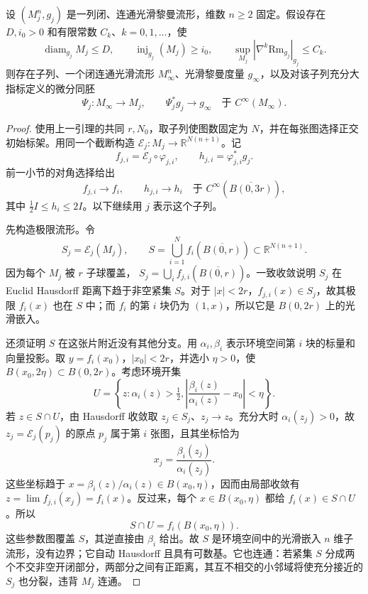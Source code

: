 \begin{theorem}\label{g3:thm:smooth-cheeger-gromov-compactness}
	设 \((M_j^n,g_j)\) 是一列闭、连通光滑黎曼流形，维数 \(n\ge2\) 固定。假设存在 \(D,i_0>0\) 和有限常数 \(C_k\)、\(k=0,1,\ldots\)，使
	\begin{equation}\label{g3:eq:smooth-compactness-assumptions}
		\operatorname{diam}_{g_j}M_j\le D,\qquad
		\operatorname{inj}_{g_j}(M_j)\ge i_0,\qquad
		\sup_{M_j}|\nabla^k\mathrm{Rm}_{g_j}|_{g_j}\le C_k.
	\end{equation}
	则存在子列、一个闭连通光滑流形 \(M_\infty^n\)、光滑黎曼度量 \(g_\infty\)，以及对该子列充分大指标定义的微分同胚
	\[
		\Psi_j:M_\infty\longrightarrow M_j,
		\qquad \Psi_j^*g_j\longrightarrow g_\infty\quad\text{于 }C^\infty(M_\infty).
	\]
\end{theorem}
\begin{proof}
	使用上一引理的共同 \(r,N_0\)，取子列使图数固定为 \(N\)，并在每张图选择正交初始标架。用同一个截断构造
	\(\mathcal E_j:M_j\to\mathbb R^{N(n+1)}\)。记
	\[
		f_{j,i}=\mathcal E_j\circ\varphi_{j,i},\qquad
		h_{j,i}=\varphi_{j,i}^*g_j.
	\]
	前一小节的对角选择给出
	\begin{equation}\label{g3:eq:compactness-local-chart-limits}
		f_{j,i}\longrightarrow f_i,\qquad
		h_{j,i}\longrightarrow h_i
		\quad\text{于 }C^\infty(\overline{B(0,3r)}),
	\end{equation}
	其中 \(\tfrac12 I\le h_i\le2I\)。以下继续用 \(j\) 表示这个子列。

	先构造极限流形。令
	\[
		S_j=\mathcal E_j(M_j),\qquad
		S=\bigcup_{i=1}^N f_i(\overline{B(0,r)})
		\subset\mathbb R^{N(n+1)}.
	\]
	因为每个 \(M_j\) 被 \(r\) 子球覆盖，
	\(S_j=\bigcup_i f_{j,i}(\overline{B(0,r)})\)。一致收敛说明 \(S_j\) 在 Euclid Hausdorff 距离下趋于非空紧集 \(S\)。对于 \(|x|<2r\)，\(f_{j,i}(x)\in S_j\)，故其极限 \(f_i(x)\) 也在 \(S\) 中；而 \(f_i\) 的第 \(i\) 块仍为 \((1,x)\)，所以它是 \(B(0,2r)\) 上的光滑嵌入。

	还须证明 \(S\) 在这张片附近没有其他分支。用 \(\alpha_i,\beta_i\) 表示环境空间第 \(i\) 块的标量和向量投影。取 \(y=f_i(x_0)\)，\(|x_0|<2r\)，并选小 \(\eta>0\)，使 \(B(x_0,2\eta)\subset B(0,2r)\)。考虑环境开集
	\[
		U=\left\{z:\alpha_i(z)>\tfrac12,
		\left|\frac{\beta_i(z)}{\alpha_i(z)}-x_0\right|<\eta\right\}.
	\]
	若 \(z\in S\cap U\)，由 Hausdorff 收敛取 \(z_j\in S_j\)、\(z_j\to z\)。充分大时 \(\alpha_i(z_j)>0\)，故 \(z_j=\mathcal E_j(p_j)\) 的原点 \(p_j\) 属于第 \(i\) 张图，且其坐标恰为
	\[
		x_j=\frac{\beta_i(z_j)}{\alpha_i(z_j)}.
	\]
	这些坐标趋于 \(x=\beta_i(z)/\alpha_i(z)\in B(x_0,\eta)\)，因而由局部收敛有 \(z=\lim f_{j,i}(x_j)=f_i(x)\)。反过来，每个 \(x\in B(x_0,\eta)\) 都给 \(f_i(x)\in S\cap U\)。所以
	\begin{equation}\label{g3:eq:limit-atlas-no-extra-sheets}
		S\cap U=f_i(B(x_0,\eta)).
	\end{equation}
	这些参数图覆盖 \(S\)，其逆直接由 \(\beta_i\) 给出。故 \(S\) 是环境空间中的光滑嵌入 \(n\) 维子流形，没有边界；它自动 Hausdorff 且具有可数基。它也连通：若紧集 \(S\) 分成两个不交非空开闭部分，两部分之间有正距离，其互不相交的小邻域将使充分接近的 \(S_j\) 也分裂，违背 \(M_j\) 连通。


\end{proof}
